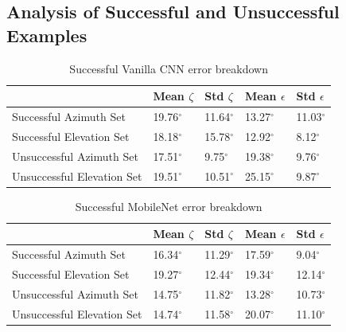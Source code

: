 \documentclass{article}
\begin{document}
\subsection{Analysis of Successful and Unsuccessful Examples}
\begin{table}[h!]
  \begin{center}
    \caption{Successful Vanilla CNN error breakdown}
    \label{tab:tablebreakdown}
    \begin{tabular}{l|l|l|l|l}
      \textbf{} & \textbf{Mean $\zeta$} &  \textbf{Std $\zeta$} & \textbf{Mean $\epsilon$} &  \textbf{Std $\epsilon$}  \\
      \hline
      Successful Azimuth Set & 19.76$^{\circ}$ & 11.64$^{\circ}$& 13.27$^{\circ}$ & 11.03$^{\circ}$ \\
      Successful Elevation Set & 18.18$^{\circ}$  & 15.78$^{\circ}$ & 12.92$^{\circ}$ & 8.12$^{\circ}$\\
      Unsuccessful Azimuth Set & 17.51$^{\circ}$ & 9.75$^{\circ}$ & 19.38$^{\circ}$ & 9.76$^{\circ}$\\
      Unsuccessful Elevation Set & 19.51$^{\circ}$  & 10.51$^{\circ}$& 25.15$^{\circ}$ & 9.87$^{\circ}$\\
    \end{tabular}
  \end{center}
\end{table}

\begin{table}[h!]
  \begin{center}
    \caption{Successful MobileNet error breakdown}
    \label{tab:tablebreakdown}
    \begin{tabular}{l|l|l|l|l}
      \textbf{} & \textbf{Mean $\zeta$} &  \textbf{Std $\zeta$} & \textbf{Mean $\epsilon$} &  \textbf{Std $\epsilon$}  \\
      \hline
      Successful Azimuth Set & 16.34$^{\circ}$ & 11.29$^{\circ}$& 17.59$^{\circ}$ & 9.04$^{\circ}$ \\
      Successful Elevation Set & 19.27$^{\circ}$  & 12.44$^{\circ}$ & 19.34$^{\circ}$ & 12.14$^{\circ}$\\
      Unsuccessful Azimuth Set & 14.75$^{\circ}$ & 11.82$^{\circ}$ & 13.28$^{\circ}$ & 10.73$^{\circ}$\\
      Unsuccessful Elevation Set & 14.74$^{\circ}$  & 11.58$^{\circ}$& 20.07$^{\circ}$ & 11.10$^{\circ}$\\
    \end{tabular}
  \end{center}
\end{table}
\end{document}
